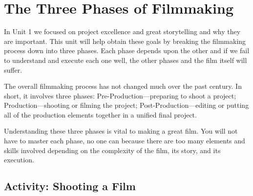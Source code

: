 \documentclass[
  letterpaper,
  DIV=11,
  numbers=noendperiod]{scrreprt}
\begin{document}
\section{The Three Phases of
Filmmaking}\label{the-three-phases-of-filmmaking}

In Unit 1 we focused on project excellence and great storytelling and
why they are important. This unit will help obtain these goals by
breaking the filmmaking process down into three phases. Each phase
depends upon the other and if we fail to understand and execute each one
well, the other phases and the film itself will suffer.

The overall filmmaking process has not changed much over the past
century. In short, it involves three phases: Pre-Production---preparing
to shoot a project; Production---shooting or filming the project;
Post-Production---editing or putting all of the production elements
together in a unified final project.

Understanding these three phases is vital to making a great film. You
will not have to master each phase, no one can because there are too
many elements and skills involved depending on the complexity of the
film, its story, and its execution.

\subsection{Activity: Shooting a Film}\label{activity-shooting-a-film}
\end{document}
